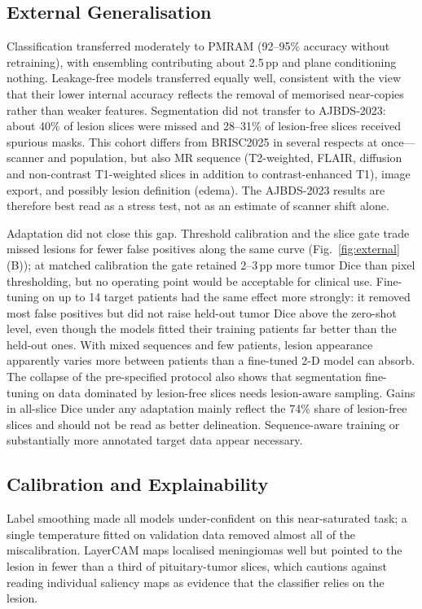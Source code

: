 \documentclass[journal]{IEEEtran}
\begin{document}
\subsection{External Generalisation}
Classification transferred moderately to PMRAM (92--95\% accuracy without retraining), with ensembling contributing about 2.5\,pp and plane conditioning nothing. Leakage-free models transferred equally well, consistent with the view that their lower internal accuracy reflects the removal of memorised near-copies rather than weaker features. Segmentation did not transfer to AJBDS-2023: about 40\% of lesion slices were missed and 28--31\% of lesion-free slices received spurious masks. This cohort differs from BRISC2025 in several respects at once---scanner and population, but also MR sequence (T2-weighted, FLAIR, diffusion and non-contrast T1-weighted slices in addition to contrast-enhanced T1), image export, and possibly lesion definition (edema). The AJBDS-2023 results are therefore best read as a stress test, not as an estimate of scanner shift alone.

Adaptation did not close this gap. Threshold calibration and the slice gate trade missed lesions for fewer false positives along the same curve (Fig.~\ref{fig:external}(B)); at matched calibration the gate retained 2--3\,pp more tumor Dice than pixel thresholding, but no operating point would be acceptable for clinical use. Fine-tuning on up to 14 target patients had the same effect more strongly: it removed most false positives but did not raise held-out tumor Dice above the zero-shot level, even though the models fitted their training patients far better than the held-out ones. With mixed sequences and few patients, lesion appearance apparently varies more between patients than a fine-tuned 2-D model can absorb. The collapse of the pre-specified protocol also shows that segmentation fine-tuning on data dominated by lesion-free slices needs lesion-aware sampling. Gains in all-slice Dice under any adaptation mainly reflect the 74\% share of lesion-free slices and should not be read as better delineation. Sequence-aware training or substantially more annotated target data appear necessary.

\subsection{Calibration and Explainability}
Label smoothing made all models under-confident on this near-saturated task; a single temperature fitted on validation data removed almost all of the miscalibration. LayerCAM maps localised meningiomas well but pointed to the lesion in fewer than a third of pituitary-tumor slices, which cautions against reading individual saliency maps as evidence that the classifier relies on the lesion.
\end{document}
